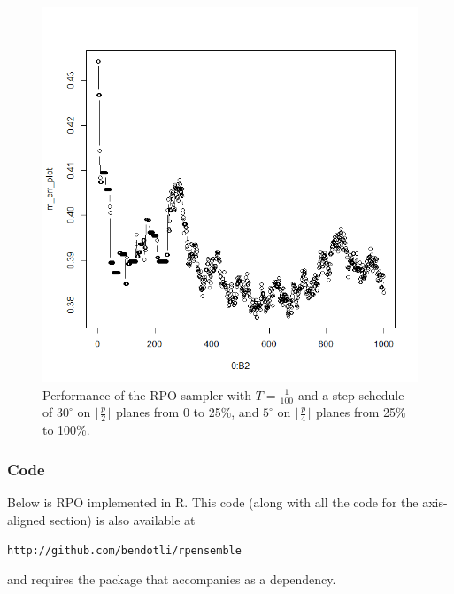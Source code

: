\documentclass{amsart}
\begin{document}
\begin{figure}
	\begin{centering}
		\includegraphics[scale=0.3]{rpo-stepsize-schedule}
		\par\end{centering}
	\caption{Performance of the RPO sampler with $T=\frac{1}{100}$ and a step schedule of $30^\circ$ on $\lfloor \frac{p}{2} \rfloor$ planes from 0 to 25\%, and $5^\circ$ on $\lfloor \frac{p}{4} \rfloor$ planes from 25\% to 100\%.}
	\label{fig:rpo-stepsize-schedule}
\end{figure}

\clearpage %

\subsubsection{Code}

Below is RPO implemented in R. This code (along with all the code for the axis-aligned section) is also available at 
\begin{center}
\texttt{http://github.com/bendotli/rpensemble}
\end{center}
 and requires the package that accompanies \cite{CS15} as a dependency.


\end{document}
